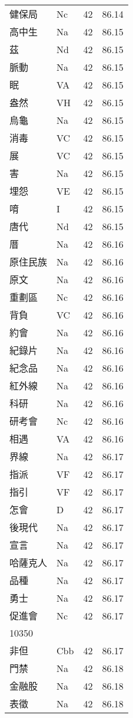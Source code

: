 \documentclass[twocolumn]{book}
\begin{document}
\begin{supertabular}{llrr}
健保局 & Nc & 42 &  86.14\\
高中生 & Na & 42 &  86.15\\
茲 & Nd & 42 &  86.15\\
脈動 & Na & 42 &  86.15\\
眠 & VA & 42 &  86.15\\
盎然 & VH & 42 &  86.15\\
烏龜 & Na & 42 &  86.15\\
消毒 & VC & 42 &  86.15\\
展 & VC & 42 &  86.15\\
害 & Na & 42 &  86.15\\
埋怨 & VE & 42 &  86.15\\
唷 & I & 42 &  86.15\\
唐代 & Nd & 42 &  86.15\\
厝 & Na & 42 &  86.16\\
原住民族 & Na & 42 &  86.16\\
原文 & Na & 42 &  86.16\\
重劃區 & Nc & 42 &  86.16\\
背負 & VC & 42 &  86.16\\
約會 & Na & 42 &  86.16\\
紀錄片 & Na & 42 &  86.16\\
紀念品 & Na & 42 &  86.16\\
紅外線 & Na & 42 &  86.16\\
科研 & Na & 42 &  86.16\\
研考會 & Nc & 42 &  86.16\\
相遇 & VA & 42 &  86.16\\
界線 & Na & 42 &  86.17\\
指派 & VF & 42 &  86.17\\
指引 & VF & 42 &  86.17\\
怎會 & D & 42 &  86.17\\
後現代 & Na & 42 &  86.17\\
宣言 & Na & 42 &  86.17\\
哈薩克人 & Na & 42 &  86.17\\
品種 & Na & 42 &  86.17\\
勇士 & Na & 42 &  86.17\\
促進會 & Nc & 42 &  86.17\\
10350\\
非但 & Cbb & 42 &  86.17\\
門禁 & Na & 42 &  86.18\\
金融股 & Na & 42 &  86.18\\
表徵 & Na & 42 &  86.18\\

\end{supertabular}
\end{document}
